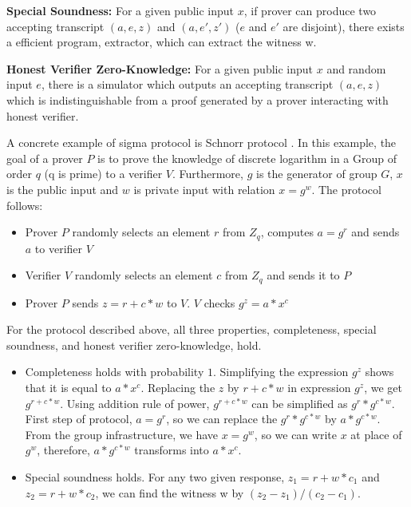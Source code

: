 {      \textbf{Special Soundness:} For a given public input $x$, if prover can produce two accepting transcript $(a, e, z)$ 
      and $(a, e', z')$ ($e$ and $e'$ are disjoint),  there exists a efficient program, extractor, which can extract the 
      witness w.
      
      \textbf{Honest Verifier Zero-Knowledge:} For a given public input $x$ and random input $e$, there is a simulator 
      which outputs an accepting transcript $(a, e, z)$ which is indistinguishable from a proof generated by 
      a prover interacting with honest verifier. 
     
     A concrete example of sigma protocol \citep{10.1007/3-540-48658-5_19} is Schnorr protocol \citep{10.1007/0-387-34805-0_22}.  In this example, 
     the goal of a prover $P$ is
     to prove the knowledge of discrete logarithm in a Group of order $q$ (q is prime) to a verifier $V$.
     Furthermore, $g$ is the generator of 
     group $G$, $x$ is the public input and $w$ is private input with relation $x = g^w$. The protocol follows:
     
     \begin{itemize}
     \item Prover $P$ randomly selects an element $r$ from $Z_{q}$, computes $a = g^r$ and sends $a$ to verifier $V$
     \item Verifier $V$ randomly selects an element $c$ from  $Z_{q}$ and sends it to $P$
     \item Prover $P$ sends $z = r + c * w $ to $V$.  $V$ checks $g^{z} = a * x^{c}$
     \end{itemize}
     
     For the protocol described above, all three properties, completeness, special soundness, and honest 
     verifier zero-knowledge, hold. 
     \begin{itemize}
      \item Completeness holds with probability $1$. Simplifying the expression $g^{z}$ shows that 
      it is equal to $a * x^{c}$. Replacing the $z$ by $r + c * w$ in expression  $g^{z}$, we get 
      $g^{r + c * w}$.  Using addition rule of power, $g^{r + c * w}$ can be simplified as 
      $g^{r} * g^{c * w}$. First step of protocol, $a = g^r$, so we can replace the $g^{r} * g^{c * w}$ 
      by $a * g^{c * w}$. From the group infrastructure, we have $x = g^w$, so we can write $x$ at place of 
      $g^{w}$, therefore, $a * g^{c * w}$ transforms into $a * x^c$. 
      
     \item Special soundness holds. For any two given response, 
     $z_{1} = r + w * c_{1}$ and  $z_{2} = r + w * c_{2}$, we can find the witness w by  $(z_{2} - z_{1})/(c_{2} - c_{1})$.
     

\end{itemize}}
